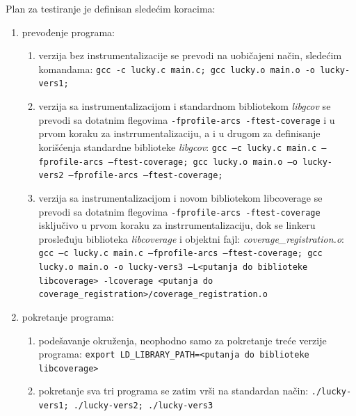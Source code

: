 \documentclass[12pt,oneside]{memoir}
\newcommand{\kod}[1]{\texttt{#1}}
\newcommand{\strano}[1]{\textit{#1}}
\begin{document}
Plan za testiranje je definisan sledećim koracima:
\begin{enumerate}

\item prevođenje programa:
\begin{enumerate}
\item verzija bez instrumentalizacije se prevodi na uobičajeni način, sledećim komandama: 
\kod{gcc -c lucky.c main.c; gcc lucky.o main.o -o lucky-vers1;}
\item verzija sa instrumentalizacijom i standardnom bibliotekom \strano{libgcov} se prevodi sa dotatnim flegovima \kod{-fprofile-arcs -ftest-coverage} i u prvom koraku za instrrumentalizaciju, a i u drugom za definisanje korišćenja standardne biblioteke \strano{libgcov}: 
\kod{gcc –c lucky.c main.c –fprofile-arcs –ftest-coverage; gcc lucky.o main.o –o lucky-vers2 –fprofile-arcs –ftest-coverage;}
\item verzija sa instrumentalizacijom i novom bibliotekom libcoverage se prevodi sa dotatnim flegovima \kod{-fprofile-arcs -ftest-coverage} isključivo u prvom koraku za instrrumentalizaciju, dok se linkeru prosleđuju biblioteka \strano{libcoverage} i objektni fajl: \strano{coverage\_registration.o}:
\kod{gcc –c lucky.c main.c –fprofile-arcs –ftest-coverage; gcc lucky.o main.o -o lucky-vers3 –L<putanja do biblioteke libcoverage> -lcoverage <putanja do coverage\_registration>/coverage\_registration.o}
\end{enumerate}

\item pokretanje programa:
\begin{enumerate}
\item podešavanje okruženja, neophodno samo za pokretanje treće verzije programa:
\kod{export LD\_LIBRARY\_PATH=<putanja do biblioteke libcoverage>}
\item pokretanje sva tri programa se zatim vrši na standardan način:
\kod{./lucky-vers1; ./lucky-vers2; ./lucky-vers3}
\end{enumerate}


\end{enumerate}
\end{document}
